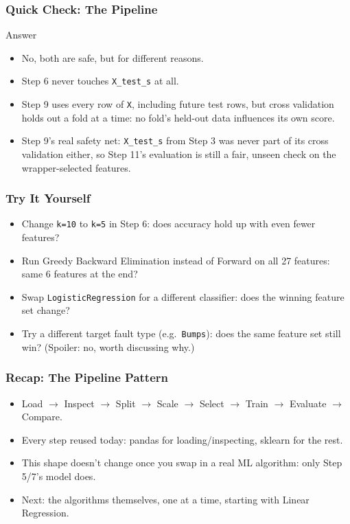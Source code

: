 \begin{frame}[fragile]\frametitle{Quick Check: The Pipeline}
\begin{block}{Answer}
\begin{itemize}
\item No, both are safe, but for different reasons.
\item Step 6 never touches \texttt{X\_test\_s} at all.
\item Step 9 uses every row of \texttt{X}, including future test rows, but cross validation holds out a fold at a time: no fold's held-out data influences its own score.
\item Step 9's real safety net: \texttt{X\_test\_s} from Step 3 was never part of its cross validation either, so Step 11's evaluation is still a fair, unseen check on the wrapper-selected features.
\end{itemize}
\end{block}
\end{frame}

\begin{frame}[fragile]\frametitle{Try It Yourself}
\begin{itemize}
\item Change \texttt{k=10} to \texttt{k=5} in Step 6: does accuracy hold up with even fewer features?
\item Run Greedy Backward Elimination instead of Forward on all 27 features: same 6 features at the end?
\item Swap \texttt{LogisticRegression} for a different classifier: does the winning feature set change?
\item Try a different target fault type (e.g.\ \texttt{Bumps}): does the same feature set still win? (Spoiler: no, worth discussing why.)
\end{itemize}
\end{frame}

\begin{frame}[fragile]\frametitle{Recap: The Pipeline Pattern}
\begin{itemize}
\item Load $\to$ Inspect $\to$ Split $\to$ Scale $\to$ Select $\to$ Train $\to$ Evaluate $\to$ Compare.
\item Every step reused today: pandas for loading/inspecting, sklearn for the rest.
\item This shape doesn't change once you swap in a real ML algorithm: only Step 5/7's model does.
\item Next: the algorithms themselves, one at a time, starting with Linear Regression.
\end{itemize}
\end{frame}
